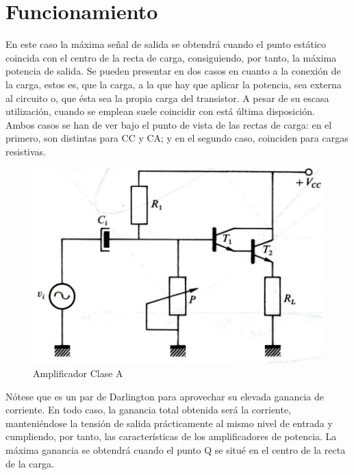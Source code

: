 \documentclass[12pt,a4paper]{article}
\begin{document}
\section{Funcionamiento}
En este caso la máxima señal de salida se obtendrá cuando el punto estático coincida con el centro de la recta de carga, consiguiendo, por tanto, la máxima potencia de salida. Se pueden presentar en dos casos en cuanto a la conexión de la carga, estos es, que la carga, a la que hay que aplicar la potencia, sea externa al circuito o, que ésta sea la propia carga del transistor. A pesar de su escasa utilización, cuando se emplean suele coincidir con está última disposición.\\
Ambos casos se han de ver bajo el punto de vista de las rectas de carga: en el primero, son distintas para CC y CA; y en el segundo caso, coinciden para cargas resistivas.\\
\begin{figure}[hbtp]
\centering
\includegraphics[scale=1]{Circuitos/1.png}
\caption{Amplificador Clase A}
\end{figure}
\newpage
Nótese que es un par de Darlington para aprovechar su elevada ganancia de corriente. En todo caso, la ganancia total obtenida será la corriente, manteniéndose la tensión de salida prácticamente al mismo nivel de entrada y cumpliendo, por tanto, las características de los amplificadores de potencia. La máxima ganancia se obtendrá cuando el punto Q se situé en el centro de la recta de la carga. 
\end{document}
